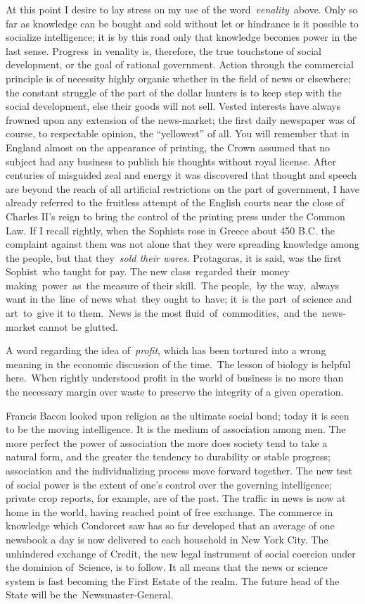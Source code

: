 \documentclass[twoside,symmetric,nobib,justified]{tufte-book}
\begin{document}
At this point I desire to lay stress on my use of the
word~\emph{venality}~above. Only so far as knowledge can be bought and
sold without let or hindrance is it possible to socialize intelligence;
it is by this road only that knowledge becomes power in the last sense.
Progress~in venality is, therefore, the true touchstone of social
development, or the goal of rational government. Action through the
commercial principle is of necessity highly organic whether in the field
of news or elsewhere; the constant struggle of the part of the dollar
hunters is to keep step with the social development, else their goods
will not sell. Vested interests have always frowned upon any extension
of the news-market; the first daily newspaper was of course, to
respectable opinion, the ``yellowest'' of all. You will remember that in
England almost on the appearance of printing, the Crown assumed that no
subject had any business to publish his thoughts without royal license.
After centuries of misguided zeal and energy it was discovered that
thought and speech are beyond the reach of all artificial restrictions
on the part of government, I have already referred to the fruitless
attempt of the English courts near the close of Charles II's reign to
bring the control of the printing press under the Common Law. If I
recall rightly, when the Sophists rose in Greece about 450 B.C. the
complaint against them was not alone that they were spreading knowledge
among the people, but that they~\emph{sold their wares}. Protagoras, it
is said, was the first Sophist~who taught for pay. The new
class~regarded their~money making~power~as~the measure of their
skill.~The people,~by the way,~always want in the~line~of news what~they
ought to~have; it~is the part~of science and art~to~give it to
them.~News is the most fluid~of~commodities,~and the~news-market cannot
be glutted.~

A word regarding the idea of~\emph{profit}, which has been tortured into
a wrong meaning in the economic discussion of the time.~The lesson of
biology is helpful here.~When rightly understood profit in the world of
business is no more than the necessary margin over waste to preserve the
integrity of a given operation.~

Francis Bacon looked upon religion as the ultimate social bond; today it
is seen to be the moving intelligence. It is the medium of association
among men. The more perfect the power of association the more does
society tend to take a natural form, and the greater the tendency to
durability or stable progress; association and the individualizing
process move forward together. The new test of social power is the
extent of one's control over the governing intelligence; private crop
reports, for example, are of the past. The traffic in news is now at
home in the world, having reached point of free exchange. The commerce
in knowledge which Condorcet saw has so far developed that an average of
one newsbook a day is now delivered to each household in New York City.
The unhindered exchange of Credit, the new legal instrument of social
coercion under the dominion of~Science, is to follow. It all means that
the news or science system is fast becoming the First Estate of the
realm. The future head of the State will be the~Newsmaster-General.~
\end{document}
